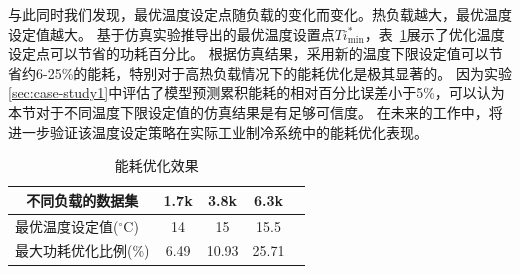 与此同时我们发现，最优温度设定点随负载的变化而变化。热负载越大，最优温度设定值越大。
基于仿真实验推导出的最优温度设置点$Ti^*_{\min}$，表~\ref{tab:power_save_percent}展示了优化温度设定点可以节省的功耗百分比。
根据仿真结果，采用新的温度下限设定值可以节省约6-25\%的能耗，特别对于高热负载情况下的能耗优化是极其显著的。
因为实验\ref{sec:case-study1}中评估了模型预测累积能耗的相对百分比误差小于5\%，可以认为本节对于不同温度下限设定值的仿真结果是有足够可信度。
在未来的工作中，将进一步验证该温度设定策略在实际工业制冷系统中的能耗优化表现。


\begin{table}[]
\centering
\caption{能耗优化效果}
\label{tab:power_save_percent}
\begin{tabular}{lcccc}
\hline
\multicolumn{1}{c}{\textbf{不同负载的数据集}} & 1.7k  & 3.8k    & 6.3k  \\ \hline
最优温度设定值(${ }^{\circ} \mathrm{C}$)               & 14   & 15     & 15.5    \\
最大功耗优化比例(\%)              & 6.49 & 10.93  & 25.71\\ \hline
\end{tabular}
\end{table}






